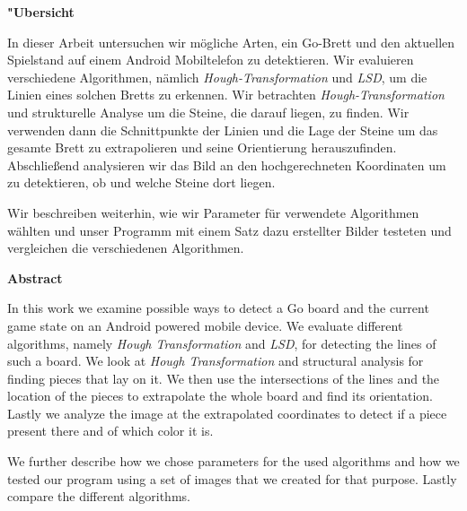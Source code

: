 \documentclass[english,bt]{package/lmedoc}
\begin{document}
\cleardoublepage

\begin{center}
\bfseries
"Ubersicht
\normalfont

In dieser Arbeit untersuchen wir mögliche Arten, ein Go-Brett und den aktuellen Spielstand auf einem Android Mobiltelefon zu detektieren. Wir evaluieren verschiedene Algorithmen, nämlich \emph{Hough-Transformation} und \emph{LSD}, um die Linien eines solchen Bretts zu erkennen. Wir betrachten \emph{Hough-Transformation} und strukturelle Analyse um die Steine, die darauf liegen, zu finden. Wir verwenden dann die Schnittpunkte der Linien und die Lage der Steine um das gesamte Brett zu extrapolieren und seine Orientierung herauszufinden. Abschließend analysieren wir das Bild an den hochgerechneten Koordinaten um zu detektieren, ob und welche Steine dort liegen.

Wir beschreiben weiterhin, wie wir Parameter für verwendete Algorithmen wählten und unser Programm mit einem Satz dazu erstellter Bilder testeten und vergleichen die verschiedenen Algorithmen.
\end{center}


\vspace{5.0cm}

\begin{center}
\bfseries
Abstract
\normalfont

In this work we examine possible ways to detect a Go board and the current game state on an Android powered mobile device. We evaluate different algorithms, namely \emph{Hough Transformation} and \emph{LSD}, for detecting the lines of such a board.  We look at \emph{Hough Transformation} and structural analysis for finding pieces that lay on it. We then use the intersections of the lines and the location of the pieces to extrapolate the whole board and find its orientation. Lastly we analyze the image at the extrapolated coordinates to detect if a piece present there and of which color it is.

We further describe how we chose parameters for the used algorithms and how we tested our program using a set of images that we created for that purpose. Lastly compare the different algorithms.
\end{center}

\cleardoublepage

\tableofcontents

\cleardoublepage {}


\cleardoublepage

\cleardoublepage

\cleardoublepage

\cleardoublepage

\cleardoublepage
\end{document}
